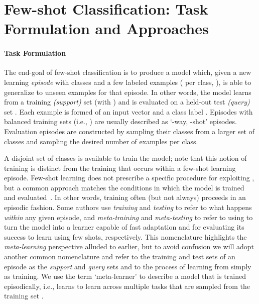 \documentclass{article} \usepackage{iclr2020_conference,times}
\begin{document}
\section{Few-shot Classification: Task Formulation and Approaches}

\paragraph{Task Formulation} The end-goal of few-shot classification is to
produce a model which, given a new learning {\em episode} with  classes and
a few labeled examples ( per class, ), is able to
generalize to unseen examples for that episode. In other words, the model
learns from a training \emph{(support)} set  (with ) and is evaluated on a held-out test \emph{(query)} set . Each example  is formed of an input vector
 and a class label .
Episodes with balanced training sets (i.e., ) are usually
described as `-way, -shot' episodes. Evaluation episodes are constructed by sampling their  classes from a
larger set  of classes and sampling the desired number of
examples per class. 

A disjoint set  of classes is available to
train the model; note that this notion of training is distinct from the
training that occurs within a few-shot learning episode. Few-shot learning does not prescribe a specific procedure for exploiting , but a
common approach matches the conditions in which the model is trained
and evaluated~\citep{vinyals2016matching}. In other words, training often (but
not always) proceeds in an episodic fashion. Some authors use {\em training}
and {\em testing} to refer to what happens {\em within} any given episode, and
{\em meta-training} and {\em meta-testing} to refer to using
 to turn the model into a  learner capable of fast
adaptation and  for evaluating its success to learn using
few shots, respectively. This nomenclature highlights the {\em meta-learning} perspective
alluded to earlier, but to avoid confusion we will adopt another common
nomenclature and refer to the training and test sets of an episode as the {\em
support} and {\em query} sets and to the process of learning from
 simply as training. We use the term `meta-learner' to
describe a model that is trained episodically, i.e., learns to learn across
multiple tasks that are sampled from the training set .
\end{document}
